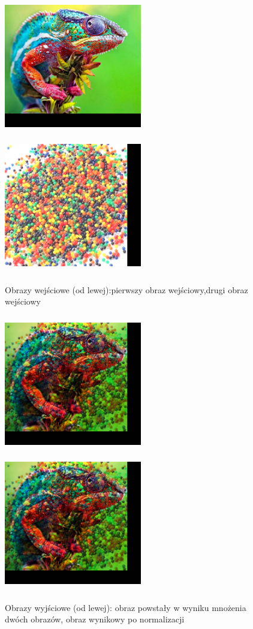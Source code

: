 \documentclass[magisterska,openany]{pracadypl}
\begin{document}
\newpage
\begin{figure}[h]
\centering
\includegraphics[width=6cm, height=6cm]{2_4/ResolRGB3.jpg}
\includegraphics[width=6cm, height=6cm]{2_4/ResolRGB4.jpg}
\caption{Obrazy wejściowe (od lewej):pierwszy obraz wejściowy,drugi obraz wejściowy}
\end{figure}
\begin{figure}[h]
\centering
\includegraphics[width=6cm, height=6cm]{4_4/multi_twoRGB2.jpg}
\includegraphics[width=6cm, height=6cm]{4_4/nmulti_twoRGB2.jpg}
\caption{Obrazy wyjściowe (od lewej): obraz powstały w wyniku mnożenia dwóch obrazów, obraz wynikowy po normalizacji}
\end{figure}
\end{document}
